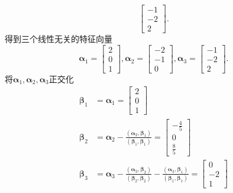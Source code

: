 \documentclass[lang=cn,11pt,normal]{elegantbook}
\begin{document}
\begin{solution}
\begin{equation}
		\begin{bmatrix}
		-1\\
		-2\\
		2
		\end{bmatrix}.
		\end{equation}
		得到三个线性无关的特征向量
		\begin{equation}
		\boldsymbol{\alpha}_1=
		\begin{bmatrix}
		2\\
		0\\
		1
		\end{bmatrix},
		\boldsymbol{\alpha}_2=
		\begin{bmatrix}
		-2\\
		-1\\
		0
		\end{bmatrix},
		\boldsymbol{\alpha}_3=
		\begin{bmatrix}
		-1\\
		-2\\
		2
		\end{bmatrix}.
		\end{equation}
		将$\boldsymbol{\alpha}_1,\boldsymbol{\alpha}_2,\boldsymbol{\alpha}_3$正交化\\
		\begin{equation}
		\begin{aligned}
		\boldsymbol{\beta}_1&=\boldsymbol{\alpha}_1=
		\begin{bmatrix}
		2\\0\\1
		\end{bmatrix}\\
		\boldsymbol{\beta}_2&=\boldsymbol{\alpha}_2-\frac{(\boldsymbol{\alpha}_2,\boldsymbol{\beta}_1)}{(\boldsymbol{\beta}_1,\boldsymbol{\beta}_1)}=
		\begin{bmatrix}
		-\frac{4}{5}\\0\\\frac{8}{5}
		\end{bmatrix}\\
		\boldsymbol{\beta}_3&=\boldsymbol{\alpha}_3-\frac{(\boldsymbol{\alpha}_3,\boldsymbol{\beta}_2)}{(\boldsymbol{\beta}_2,\boldsymbol{\beta}_2)}-\frac{(\boldsymbol{\alpha}_3,\boldsymbol{\beta}_1)}{(\boldsymbol{\beta}_1,\boldsymbol{\beta}_1)}=
		\begin{bmatrix}
		0\\-2\\1
		\end{bmatrix}
		\end{aligned}
		\end{equation}

\end{solution}
\end{document}

